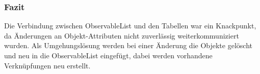 \subsubsection{Fazit}
Die Verbindung zwischen ObservableList und den Tabellen war ein Knackpunkt, da Änderungen an Objekt-Attributen nicht zuverlässig weiterkommuniziert wurden. Als Umgehungslösung werden bei einer Änderung die Objekte gelöscht und neu in die ObservableList eingefügt, dabei werden vorhandene Verknüpfungen neu erstellt.